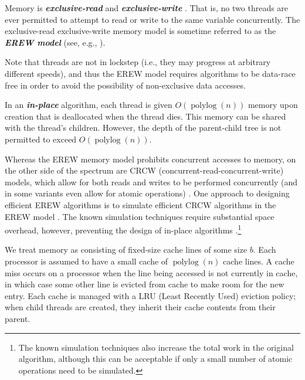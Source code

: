 \documentclass[11pt]{article}
\newcommand{\polylog}{\operatorname{polylog}}
\newcommand{\defn}[1]{{\textit{\textbf{\boldmath #1}}} }
\renewcommand{\paragraph}[1]{\vspace{0.09in}\noindent{\bf \boldmath #1.}}
\theoremstyle{remark}
\theoremstyle{remark}
\begin{document}
\paragraph{Memory Model} Memory is \defn{exclusive-read} and \defn{exclusive-write}. That is, no two threads are ever permitted to attempt to read or write to the same variable concurrently. 
The exclusive-read exclusive-write memory model is sometime referred
to as the \defn{EREW model} (see, e.g., \cite{Hagerup89}).

Note that threads are not in lockstep (i.e., they may progress at arbitrary different speeds), and thus the EREW model requires algorithms to be data-race free in order to avoid the possibility of non-exclusive data accesses.

In an \defn{in-place} algorithm, each thread is given $O(\polylog(n))$
memory upon creation that is deallocated when the thread dies. This
memory can be shared with the thread's children. However, the depth of
the parent-child tree is not permitted to exceed $O(\polylog(n))$.

Whereas the EREW memory model prohibits concurrent accesses to memory, on the
other side of the spectrum are CRCW (concurrent-read-concurrent-write) models,
which allow for both reads and writes to be performed concurrently (and in some
variants even allow for atomic operations)
\cite{Blelloch96,AcarBl16,MatiasVi95}. One approach to designing efficient EREW
algorithms is to simulate efficient CRCW algorithms in the EREW model
\cite{MatiasVi95}. The known simulation techniques require substantial space
overhead, however, preventing the design of in-place algorithms
\cite{MatiasVi95}.\footnote{The known simulation techniques also increase the
total work in the original algorithm, although this can be acceptable if only a
small number of atomic operations need to be simulated.}



\paragraph{Modeling Cache Misses}
We treat memory as consisting of fixed-size cache lines of some
size $b$. Each processor is assumed to have a small cache of
$\polylog(n)$ cache lines.  A cache miss occurs on a
processor when the line being accessed is not currently in cache, in
which case some other line is evicted from cache to make room for the
new entry.  Each cache is managed with a LRU (Least Recently Used)
eviction policy; when child threads are created, they inherit their
cache contents from their parent.
\end{document}
